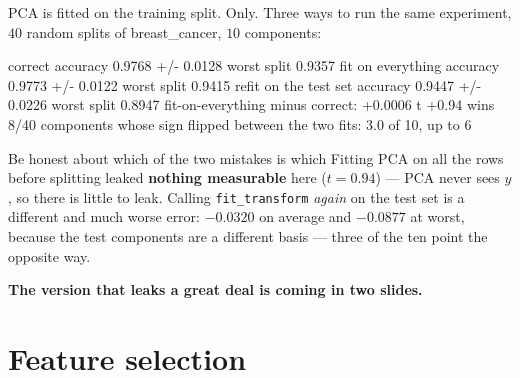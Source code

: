 \documentclass[aspectratio=169]{beamer}
\begin{document}
\begin{frame}[fragile,shrink=8]{PCA is fitted on the training split. Only.}
Three ways to run the same experiment, $40$ random splits of breast\_cancer,
$10$ components:
\begin{outblk}
  correct                  accuracy 0.9768  +/- 0.0128   worst split 0.9357
  fit on everything        accuracy 0.9773  +/- 0.0122   worst split 0.9415
  refit on the test set    accuracy 0.9447  +/- 0.0226   worst split 0.8947
  fit-on-everything minus correct: +0.0006  t +0.94  wins 8/40
  components whose sign flipped between the two fits: 3.0 of 10, up to 6
\end{outblk}
\begin{alertblock}{Be honest about which of the two mistakes is which}
  \footnotesize Fitting PCA on all the rows before splitting leaked
  \textbf{nothing measurable} here ($t = 0.94$) --- PCA never sees $y$, so
  there is little to leak. Calling \texttt{fit\_transform} \emph{again} on
  the test set is a different and much worse error: $-0.0320$ on average
  and $-0.0877$ at worst, because the
  test components are a different basis --- three of the ten point the
  opposite way.
\end{alertblock}
\begin{center}\small
  \textbf{The version that leaks a great deal is coming in two slides.}
\end{center}
\end{frame}

\section[Selection]{Feature selection}
\label{sec:select}
\end{document}
